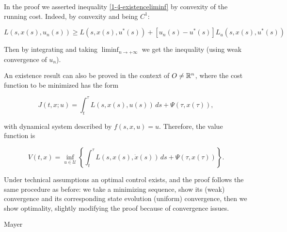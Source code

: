 \begin{remark}\label{1-4-reamrkconvexity}
    In the proof we asserted inequality \eqref{1-4-existenceliminf} by convexity of the running cost. Indeed, 
    by convexity and being $C^1$:

    \[L(s,x(s),u_n(s)) \geq L(s,x(s),u^{\ast}(s)) + \left[u_n(s) - u^{\ast}(s)\right]L_u(s,x(s),u^{\ast}(s))\]

    Then by integrating and taking $\liminf_{n\to+\infty}$ we get the inequality (using weak convergence of $u_n$). 
\end{remark}

An existence result can also be proved in the context of $O\neq\mathbb{R}^n$, where the cost function
to be minimized has the form

\begin{equation}
    J(t,x;u)=\int_t^{\tau} L(s,x(s),u(s)) \,ds + \Psi(\tau,x(\tau)),
\end{equation}

with dynamical system described by $f(s,x,u)=u$. Therefore, the value function is

\begin{equation}
    V(t,x) = \inf_{u\in\mathcal{U}} \left\{\int_t^{\tau} L(s,x(s),\dot{x}(s)) \,ds + \Psi(\tau,x(\tau))\right\}.
\end{equation}

Under technical assumptions an optimal control exists, and the proof follows
the same procedure as before: we take a minimizing sequence, show its (weak) convergence
and its corresponding state evolution (uniform) convergence, then we show 
optimality, slightly modifying the proof because of convergence issues.

{\color{red}{} Mayer}
